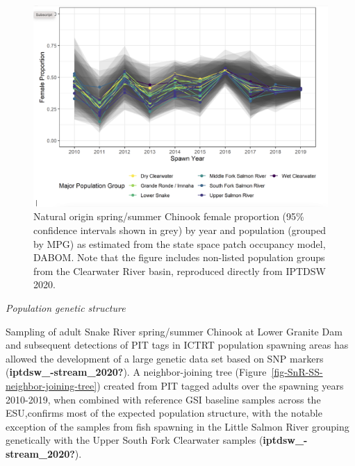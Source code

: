 \documentclass[
  letterpaper,
  oneside,
  open=any]{scrbook}
\begin{document}
\begin{figure}

{\centering \includegraphics[width=6.01in,height=\textheight]{content/Interior_Columbia/../../media/image23.png}

}

\caption{\label{fig-SnR-DABOM}Natural origin spring/summer Chinook
female proportion (95\% confidence intervals shown in grey) by year and
population (grouped by MPG) as estimated from the state space patch
occupancy model, DABOM. Note that the figure includes non-listed
population groups from the Clearwater River basin, reproduced directly
from IPTDSW 2020.}

\end{figure}

\emph{Population genetic structure}

Sampling of adult Snake River spring/summer Chinook at Lower Granite Dam
and subsequent detections of PIT tags in ICTRT population spawning areas
has allowed the development of a large genetic data set based on SNP
markers (\textbf{iptdsw\_-stream\_2020?}). A neighbor-joining tree
(Figure~\ref{fig-SnR-SS-neighbor-joining-tree}) created from PIT tagged
adults over the spawning years 2010-2019, when combined with reference
GSI baseline samples across the ESU,confirms most of the expected
population structure, with the notable exception of the samples from
fish spawning in the Little Salmon River grouping genetically with the
Upper South Fork Clearwater samples (\textbf{iptdsw\_-stream\_2020?}).
\end{document}
